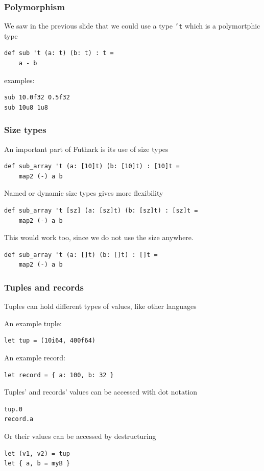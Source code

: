 \documentclass{beamer}
\begin{document}
\begin{frame}[fragile]
    \frametitle{Polymorphism}
    We saw in the previous slide that we could use a type \texttt{'t} which is a polymortphic type
    \begin{lstlisting}
def sub 't (a: t) (b: t) : t =
    a - b
    \end{lstlisting}
    \pause
    examples:
    \begin{lstlisting}
sub 10.0f32 0.5f32
sub 10u8 1u8
    \end{lstlisting}
\end{frame}

\begin{frame}[fragile]
    \frametitle{Size types}
    An important part of Futhark is its use of size types
    \begin{lstlisting}
def sub_array 't (a: [10]t) (b: [10]t) : [10]t =
    map2 (-) a b
    \end{lstlisting}
    \pause
    Named or dynamic size types gives more flexibility
    \begin{lstlisting}
def sub_array 't [sz] (a: [sz]t) (b: [sz]t) : [sz]t =
    map2 (-) a b
    \end{lstlisting}
    \pause
    This would work too, since we do not use the size anywhere.
    \begin{lstlisting}
def sub_array 't (a: []t) (b: []t) : []t =
    map2 (-) a b
    \end{lstlisting}
\end{frame}

\begin{frame}[fragile]
    \frametitle{Tuples and records}
    Tuples can hold different types of values, like other languages

    An example tuple:
    \begin{lstlisting}
let tup = (10i64, 400f64)
    \end{lstlisting}
    \pause
    An example record:
    \begin{lstlisting}
let record = { a: 100, b: 32 }
    \end{lstlisting}
    \pause
    Tuples' and records' values can be accessed with dot notation
    \begin{lstlisting}
tup.0
record.a
    \end{lstlisting}
    \pause
    Or their values can be accessed by destructuring
    \begin{lstlisting}
let (v1, v2) = tup
let { a, b = myB }
    \end{lstlisting}
\end{frame}
\end{document}
